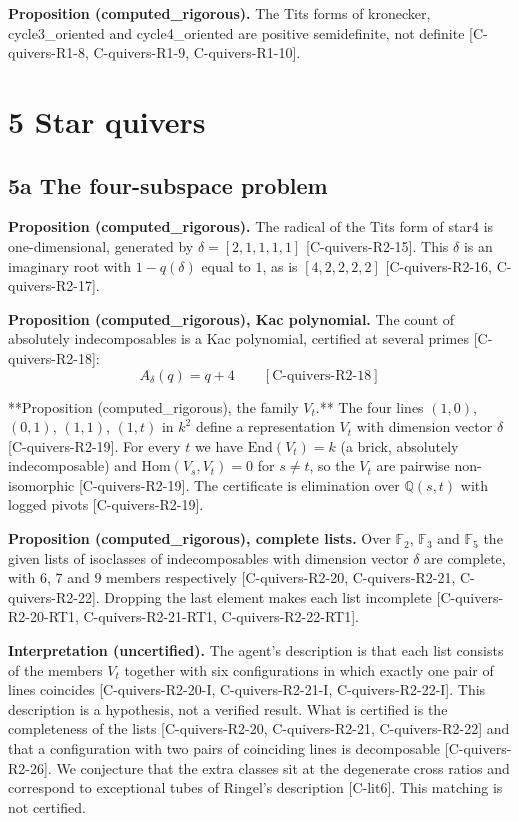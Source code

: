 \documentclass[10pt,twocolumn]{article}
\begin{document}
\textbf{Proposition (computed\_rigorous).} The Tits forms of kronecker, cycle3\_oriented and cycle4\_oriented are positive semidefinite, not definite {\scriptsize[C-quivers-R1-8, C-quivers-R1-9, C-quivers-R1-10]}.

\section*{5 Star quivers}

\subsection*{5a The four-subspace problem}

\textbf{Proposition (computed\_rigorous).} The radical of the Tits form of star4 is one-dimensional, generated by $\delta=[2, 1, 1, 1, 1]$ {\scriptsize[C-quivers-R2-15]}. This $\delta$ is an imaginary root with $1-q(\delta)$ equal to $1$, as is $[4, 2, 2, 2, 2]$ {\scriptsize[C-quivers-R2-16, C-quivers-R2-17]}.

\textbf{Proposition (computed\_rigorous), Kac polynomial.} The count of absolutely indecomposables is a Kac polynomial, certified at several primes {\scriptsize[C-quivers-R2-18]}:
$$A_\delta(q)=q+4 \qquad [\text{C-quivers-R2-18}]$$

**Proposition (computed\_rigorous), the family $V_t$.** The four lines $(1, 0)$, $(0, 1)$, $(1, 1)$, $(1, t)$ in $k^2$ define a representation $V_t$ with dimension vector $\delta$ {\scriptsize[C-quivers-R2-19]}. For every $t$ we have $\mathrm{End}(V_t)=k$ (a brick, absolutely indecomposable) and $\mathrm{Hom}(V_s,V_t)=0$ for $s\ne t$, so the $V_t$ are pairwise non-isomorphic {\scriptsize[C-quivers-R2-19]}. The certificate is elimination over $\mathbb Q(s,t)$ with logged pivots {\scriptsize[C-quivers-R2-19]}.

\textbf{Proposition (computed\_rigorous), complete lists.} Over $\mathbb F_2$, $\mathbb F_3$ and $\mathbb F_5$ the given lists of isoclasses of indecomposables with dimension vector $\delta$ are complete, with $6$, $7$ and $9$ members respectively {\scriptsize[C-quivers-R2-20, C-quivers-R2-21, C-quivers-R2-22]}. Dropping the last element makes each list incomplete {\scriptsize[C-quivers-R2-20-RT1, C-quivers-R2-21-RT1, C-quivers-R2-22-RT1]}.

\textbf{Interpretation (uncertified).} The agent's description is that each list consists of the members $V_t$ together with six configurations in which exactly one pair of lines coincides {\scriptsize[C-quivers-R2-20-I, C-quivers-R2-21-I, C-quivers-R2-22-I]}. This description is a hypothesis, not a verified result. What is certified is the completeness of the lists {\scriptsize[C-quivers-R2-20, C-quivers-R2-21, C-quivers-R2-22]} and that a configuration with two pairs of coinciding lines is decomposable {\scriptsize[C-quivers-R2-26]}. We conjecture that the extra classes sit at the degenerate cross ratios and correspond to exceptional tubes of Ringel's description {\scriptsize[C-lit6]}. This matching is not certified.
\end{document}
